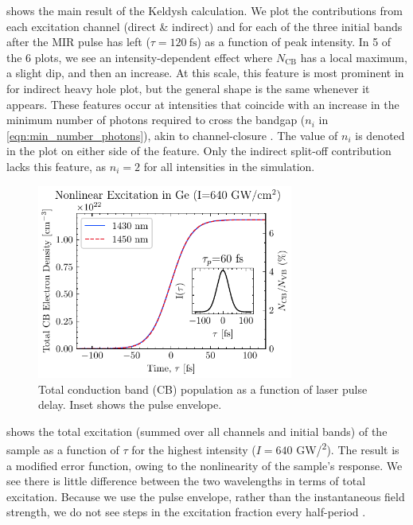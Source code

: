  shows the main result of the Keldysh calculation. We plot the contributions from each excitation channel (direct \& indirect) and for each of the three initial bands after the MIR pulse has left ($\tau = 120 \ \textrm{fs}$) as a function of peak intensity. In 5 of the 6 plots, we see an intensity-dependent effect where $N_{\textrm{CB}}$ has a local maximum, a slight dip, and then an increase. At this scale, this feature is most prominent in for indirect heavy hole plot, but the general shape is the same whenever it appears. These features occur at intensities that coincide with an increase in the minimum number of photons required to cross the bandgap ($n_i$ in \cref{eqn:min_number_photons}), akin to channel-closure \cite{shcheblanovNonlinearPhotoionizationTransparent2017}. The value of $n_i$ is denoted in the plot on either side of the feature. Only the indirect split-off contribution lacks this feature, as $n_i=2$ for all intensities in the simulation.

\begin{figure}
	\centering
	\includegraphics[width=0.75\textwidth]{figures/chap4/Total_CB_dens_vs_Time.pdf}
	\caption{Total conduction band (CB) population as a function of laser pulse delay. Inset shows the pulse envelope.}
	\label{fig:Total_CB_dens_vs_Time}
\end{figure}

 shows the total excitation (summed over all channels and initial bands) of the sample as a function of $\tau$ for the highest intensity ($I = 640$ GW/\textsuperscript{2}). The result is a modified error function, owing to the nonlinearity of the sample's response. We see there is little difference between the two wavelengths in terms of total excitation. Because we use the pulse envelope, rather than the instantaneous field strength, we do not see steps in the excitation fraction every half-period \cite{schultzeAttosecondBandgapDynamics2014}.

